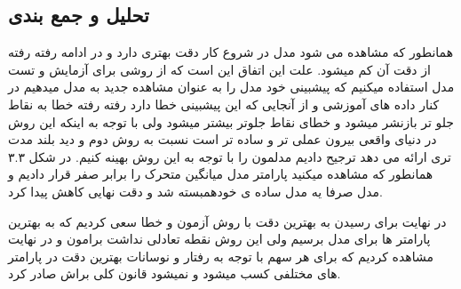 \documentclass[12pt]{report}
\begin{document}
\subsection{تحلیل و جمع بندی}
همانطور که مشاهده می شود مدل در شروع کار دقت بهتری دارد و در ادامه رفته رفته از دقت آن کم میشود. علت این اتفاق این است که از روشی برای آزمایش و تست مدل استفاده میکنیم که پیشبینی خود مدل را به عنوان مشاهده جدید به مدل میدهیم در کنار داده های آموزشی و از آنجایی که این پیشبینی خطا دارد رفته رفته خطا به نقاط جلو تر بازنشر میشود و خطای نقاط جلوتر بیشتر میشود ولی با توجه به اینکه این روش در دنیای واقعی بیرون عملی تر و ساده تر است نسبت به روش دوم و دید بلند مدت تری ارائه می دهد ترجیح دادیم مدلمون را با توجه به این روش بهینه کنیم. 
در شکل ۳.۳ همانطور که مشاهده میکنید پارامتر مدل میانگین متحرک را برابر صفر قرار دادیم و مدل صرفا یه مدل ساده ی خودهمبسته شد و دقت نهایی کاهش پیدا کرد.
\par
در نهایت برای رسیدن به بهترین دقت با روش آزمون و خطا سعی کردیم که به بهترین پارامتر ها برای مدل برسیم ولی این روش نقطه تعادلی نداشت برامون و در نهایت مشاهده کردیم که برای هر سهم با توجه به رفتار و نوسانات بهترین دقت در پارامتر های مختلفی کسب میشود و نمیشود قانون کلی براش صادر کرد.
\end{document}
